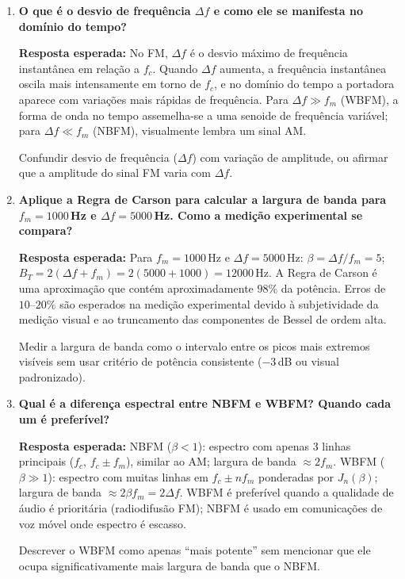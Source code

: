 \documentclass[11pt,a4paper]{article}
\begin{document}
\begin{enumerate}[label=\textbf{Q\arabic*.}, leftmargin=*, itemsep=1em]

  \item \textbf{O que é o desvio de frequência $\Delta f$ e como ele se manifesta no domínio do tempo?}

    \textbf{Resposta esperada:} No FM, $\Delta f$ é o desvio máximo de frequência
    instantânea em relação a $f_c$. Quando $\Delta f$ aumenta, a frequência instantânea
    oscila mais intensamente em torno de $f_c$, e no domínio do tempo a portadora
    aparece com variações mais rápidas de frequência. Para $\Delta f \gg f_m$ (WBFM),
    a forma de onda no tempo assemelha-se a uma senoide de frequência variável;
    para $\Delta f \ll f_m$ (NBFM), visualmente lembra um sinal AM.

    \begin{nota}
      Confundir desvio de frequência ($\Delta f$) com variação de amplitude, ou afirmar
      que a amplitude do sinal FM varia com $\Delta f$.
    \end{nota}

  \item \textbf{Aplique a Regra de Carson para calcular a largura de banda para $f_m=1000$\,Hz e $\Delta f=5000$\,Hz. Como a medição experimental se compara?}

    \textbf{Resposta esperada:} Para $f_m=1000$\,Hz e $\Delta f=5000$\,Hz:
    $\beta = \Delta f / f_m = 5$; $B_T = 2(\Delta f + f_m) = 2(5000+1000) = 12000$\,Hz.
    A Regra de Carson é uma aproximação que contém aproximadamente $98\%$ da potência.
    Erros de $10$--$20\%$ são esperados na medição experimental devido à subjetividade
    da medição visual e ao truncamento das componentes de Bessel de ordem alta.

    \begin{nota}
      Medir a largura de banda como o intervalo entre os picos mais extremos visíveis
      sem usar critério de potência consistente ($-3$\,dB ou visual padronizado).
    \end{nota}

  \item \textbf{Qual é a diferença espectral entre NBFM e WBFM? Quando cada um é preferível?}

    \textbf{Resposta esperada:} NBFM ($\beta < 1$): espectro com apenas 3 linhas
    principais ($f_c$, $f_c \pm f_m$), similar ao AM; largura de banda $\approx 2f_m$.
    WBFM ($\beta \gg 1$): espectro com muitas linhas em $f_c \pm n f_m$ ponderadas
    por $J_n(\beta)$; largura de banda $\approx 2\beta f_m = 2\Delta f$. WBFM é
    preferível quando a qualidade de áudio é prioritária (radiodifusão FM); NBFM é
    usado em comunicações de voz móvel onde espectro é escasso.

    \begin{nota}
      Descrever o WBFM como apenas ``mais potente'' sem mencionar que ele ocupa
      significativamente mais largura de banda que o NBFM.
    \end{nota}

\end{enumerate}
\end{document}

